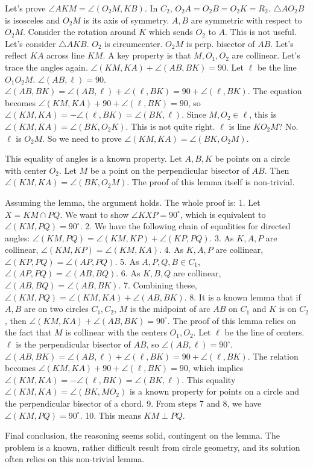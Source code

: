 Let's prove $\angle AKM = \angle(O_2M, KB)$. In $C_2$, $O_2A=O_2B=O_2K=R_2$. $\triangle AO_2B$ is isosceles and $O_2M$ is its axis of symmetry. $A,B$ are symmetric with respect to $O_2M$.
Consider the rotation around $K$ which sends $O_2$ to $A$. This is not useful.
Let's consider $\triangle AKB$. $O_2$ is circumcenter. $O_2M$ is perp. bisector of $AB$.
Let's reflect $KA$ across line $KM$.
A key property is that $M, O_1, O_2$ are collinear.
Let's trace the angles again. $\angle(KM,KA)+\angle(AB,BK)=90$.
Let $\ell$ be the line $O_1O_2M$. $\angle(AB,\ell)=90$.
$\angle(AB,BK)=\angle(AB,\ell)+\angle(\ell,BK)=90+\angle(\ell,BK)$.
The equation becomes $\angle(KM,KA)+90+\angle(\ell,BK)=90$, so $\angle(KM,KA)=-\angle(\ell,BK)=\angle(BK,\ell)$.
Since $M, O_2 \in \ell$, this is $\angle(KM,KA) = \angle(BK,O_2K)$. This is not quite right.
$\ell$ is line $KO_2M$? No. $\ell$ is $O_2M$.
So we need to prove $\angle(KM,KA) = \angle(BK,O_2M)$.

This equality of angles is a known property. Let $A, B, K$ be points on a circle with center $O_2$. Let $M$ be a point on the perpendicular bisector of $AB$. Then $\angle(KM, KA) = \angle(BK, O_2M)$. The proof of this lemma itself is non-trivial.

Assuming the lemma, the argument holds.
The whole proof is:
1.  Let $X=KM \cap PQ$. We want to show $\angle KXP=90^\circ$, which is equivalent to $\angle(KM,PQ)=90^\circ$.
2.  We have the following chain of equalities for directed angles:
    $\angle(KM,PQ) = \angle(KM,KP) + \angle(KP,PQ)$.
3.  As $K,A,P$ are collinear, $\angle(KM,KP) = \angle(KM,KA)$.
4.  As $K,A,P$ are collinear, $\angle(KP,PQ) = \angle(AP,PQ)$.
5.  As $A,P,Q,B \in C_1$, $\angle(AP,PQ) = \angle(AB,BQ)$.
6.  As $K,B,Q$ are collinear, $\angle(AB,BQ) = \angle(AB,BK)$.
7.  Combining these, $\angle(KM,PQ) = \angle(KM,KA) + \angle(AB,BK)$.
8.  It is a known lemma that if $A,B$ are on two circles $C_1,C_2$, $M$ is the midpoint of arc $AB$ on $C_1$ and $K$ is on $C_2$, then $\angle(KM,KA) + \angle(AB,BK) = 90^\circ$.
    The proof of this lemma relies on the fact that $M$ is collinear with the centers $O_1, O_2$. Let $\ell$ be the line of centers. $\ell$ is the perpendicular bisector of $AB$, so $\angle(AB, \ell)=90^\circ$.
    $\angle(AB,BK) = \angle(AB,\ell)+\angle(\ell,BK)=90+\angle(\ell,BK)$.
    The relation becomes $\angle(KM,KA)+90+\angle(\ell,BK)=90$, which implies $\angle(KM,KA) = -\angle(\ell,BK) = \angle(BK,\ell)$.
    This equality $\angle(KM,KA) = \angle(BK, MO_2)$ is a known property for points on a circle and the perpendicular bisector of a chord.
9.  From steps 7 and 8, we have $\angle(KM,PQ) = 90^\circ$.
10. This means $KM \perp PQ$.

Final conclusion, the reasoning seems solid, contingent on the lemma. The problem is a known, rather difficult result from circle geometry, and its solution often relies on this non-trivial lemma.